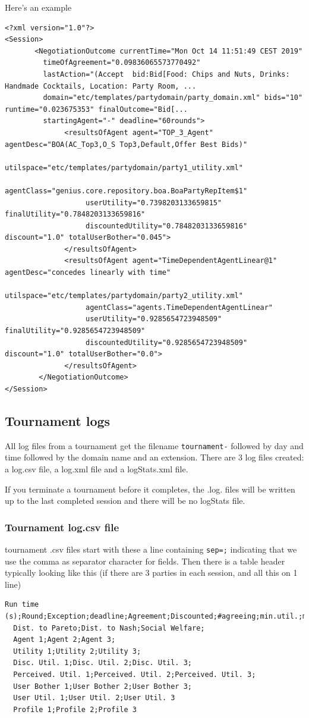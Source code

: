 \documentclass[]{article}
\begin{document}
Here's an example
\begin{verbatim}
<?xml version="1.0"?>
<Session>
       <NegotiationOutcome currentTime="Mon Oct 14 11:51:49 CEST 2019" 
         timeOfAgreement="0.09836065573770492" 
         lastAction="(Accept  bid:Bid[Food: Chips and Nuts, Drinks: Handmade Cocktails, Location: Party Room, ...   	  
         domain="etc/templates/partydomain/party_domain.xml" bids="10" runtime="0.023675353" finalOutcome="Bid[...
         startingAgent="-" deadline="60rounds">
              <resultsOfAgent agent="TOP_3_Agent" agentDesc="BOA(AC_Top3,O_S Top3,Default,Offer Best Bids)" 
                   utilspace="etc/templates/partydomain/party1_utility.xml" 
                   agentClass="genius.core.repository.boa.BoaPartyRepItem$1" 
                   userUtility="0.7398203133659815" finalUtility="0.7848203133659816" 
                   discountedUtility="0.7848203133659816" discount="1.0" totalUserBother="0.045">
              </resultsOfAgent>
              <resultsOfAgent agent="TimeDependentAgentLinear@1" agentDesc="concedes linearly with time" 
                   utilspace="etc/templates/partydomain/party2_utility.xml" 
                   agentClass="agents.TimeDependentAgentLinear" 
                   userUtility="0.9285654723948509" finalUtility="0.9285654723948509" 
                   discountedUtility="0.9285654723948509" discount="1.0" totalUserBother="0.0">
              </resultsOfAgent>
        </NegotiationOutcome>
</Session>\end{verbatim}



\subsection{Tournament logs}
All log files from a tournament get the filename \verb|tournament-| followed by day and time followed by the domain name and an extension.
There are 3 log files created: a log.csv file, a log.xml file and a logStats.xml file.

If you terminate a tournament before it completes, the .log. files will be written up to the last completed session and there will be no logStats file.

\subsubsection{Tournament log.csv file}

tournament .csv files start with these a line containing \verb|sep=;| indicating that we use the comma as separator character for fields.
Then there is a table header typically looking like this (if there are 3 parties in each session, and all this on 1 line)
\begin{verbatim}
Run time (s);Round;Exception;deadline;Agreement;Discounted;#agreeing;min.util.;max.util.;
  Dist. to Pareto;Dist. to Nash;Social Welfare;
  Agent 1;Agent 2;Agent 3;
  Utility 1;Utility 2;Utility 3;
  Disc. Util. 1;Disc. Util. 2;Disc. Util. 3;
  Perceived. Util. 1;Perceived. Util. 2;Perceived. Util. 3;
  User Bother 1;User Bother 2;User Bother 3;
  User Util. 1;User Util. 2;User Util. 3
  Profile 1;Profile 2;Profile 3
\end{verbatim}
\end{document}
